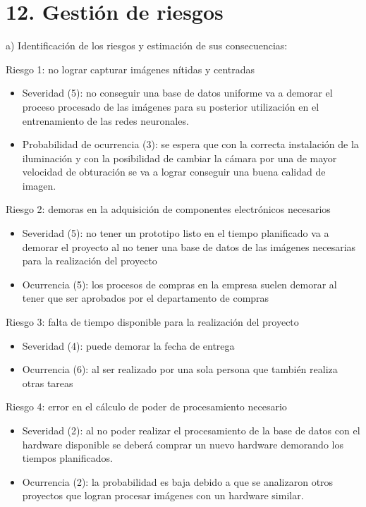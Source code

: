 \documentclass[11pt]{charter}
\begin{document}



\section{12. Gestión de riesgos}
\label{sec:riesgos}

a) Identificación de los riesgos y estimación de sus consecuencias:

Riesgo 1: no lograr capturar imágenes nítidas y centradas
\begin{itemize}
\item Severidad (5): no conseguir una base de datos uniforme va a demorar el proceso procesado de las imágenes para su posterior utilización en el entrenamiento de las redes neuronales.
\item Probabilidad de ocurrencia (3): se espera que con la correcta instalación de la iluminación y con la posibilidad de cambiar la cámara por una de mayor velocidad de obturación se va a lograr conseguir una buena calidad de imagen.  
\end{itemize}   

Riesgo 2: demoras en la adquisición de componentes electrónicos necesarios
\begin{itemize}
\item Severidad (5): no tener un prototipo listo en el tiempo planificado va a demorar el proyecto al no tener una base de datos de las imágenes necesarias para la realización del proyecto 
\item Ocurrencia (5): los procesos de compras en la empresa suelen demorar al tener que ser aprobados por el departamento de compras
\end{itemize}

Riesgo 3: falta de tiempo disponible para la realización del proyecto

\begin{itemize}
\item Severidad (4): puede demorar la fecha de entrega
\item Ocurrencia (6): al ser realizado por una sola persona que también realiza otras tareas
\end{itemize}

Riesgo 4: error en el cálculo de poder de procesamiento necesario
\begin{itemize}
\item Severidad (2): al no poder realizar el procesamiento de la base de datos con el hardware disponible se deberá comprar un nuevo hardware demorando los tiempos planificados.  
\item Ocurrencia (2): la probabilidad es baja debido a que se analizaron otros proyectos que logran procesar imágenes con un hardware similar. 
\end{itemize}
\end{document}

